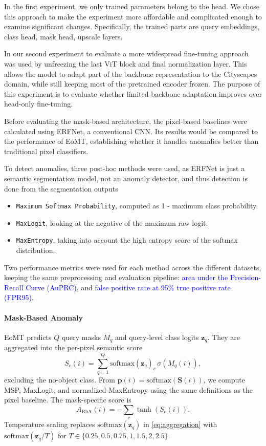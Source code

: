 \documentclass[10pt,twocolumn,letterpaper]{article}
\begin{document}
In the first experiment, we only trained parameters belong to the head. We chose this approach to make the experiment more affordable and complicated enough to examine significant changes. Specifically, the trained parts are query embeddings, class head, mask head, upscale layers. 

In our second experiment to evaluate a more widespread fine-tuning approach was used by unfreezing the last ViT block and final normalization layer. This allows the model to adapt part of the backbone representation to the Cityscapes domain, while still keeping most of the pretrained encoder frozen. The purpose of this experiment is to evaluate whether limited backbone adaptation improves over head-only fine-tuning.

Before evaluating the mask-based architecture, the pixel-based baselines were calculated using ERFNet, a conventional CNN. Its results would be compared to the performance of EoMT, establishing whether it handles anomalies better than traditional pixel classifiers.

To detect anomalies, three post-hoc methods were used, as ERFNet is just a semantic segmentation model, not an anomaly detector, and thus detection is done from the segmentation outputs

\begin{itemize}
    \item \texttt{Maximum Softmax Probability}, computed as 1 - maximum class probability.
    \item \texttt{MaxLogit}, looking at the negative of the maximum raw logit.
    \item \texttt{MaxEntropy}, taking into account the high entropy score of the softmax distribution.
\end{itemize}

Two performance metrics were used for each method across the different datasets, keeping the same preprocessing and evaluation pipeline:  \textcolor{blue}{area under the Precision-Recall Curve (AuPRC)}, and  \textcolor{blue}{false positive rate at 95\% true positive rate (FPR95)}.

\paragraph{Mask-Based Anomaly}EoMT predicts $Q$ query masks $M_q$ and query-level class logits $\mathbf{z}_q$.
They are aggregated into the per-pixel semantic score
\begin{equation}
S_c(i)=\sum_{q=1}^{Q}
    \text{softmax}(\mathbf{z}_q)_c\,\sigma(M_q(i)),
\label{eq:aggregation}
\end{equation}
excluding the no-object class. From $\mathbf{p}(i)=\text{softmax}(\mathbf{S}(i))$, we
compute MSP, MaxLogit, and normalized MaxEntropy using the same definitions as the
pixel baseline. The mask-specific score is
\begin{equation}
    A_{\mathrm{RbA}}(i)=-\sum_c\tanh(S_c(i)).
\label{eq:rba}
\end{equation}
Temperature scaling replaces
$\text{softmax}(\mathbf{z}_q)$ in \cref{eq:aggregation} with
$\text{softmax}(\mathbf{z}_q/T)$ for
$T\in\{0.25,0.5,0.75,1,1.5,2,2.5\}$.
\end{document}
